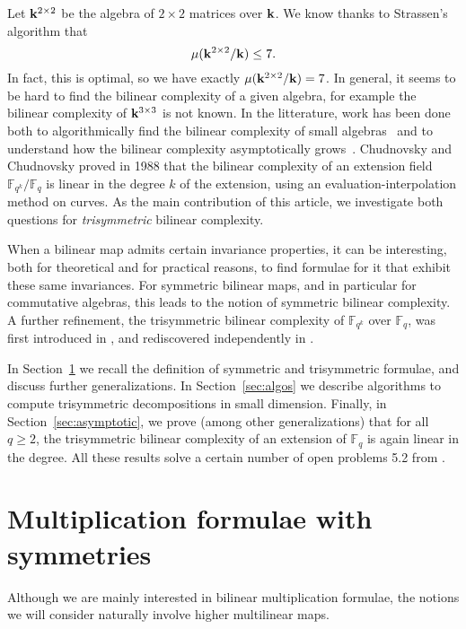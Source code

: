 \documentclass[11pt]{article}
\begin{document}
Let $\mathbf{k}^{2\times2}$ be the algebra
of $2\times2$ matrices over $\mathbf{k}$. We know thanks to Strassen's algorithm that 
\[
  \mu(\mathbf{k}^{2\times 2}/\mathbf{k}) \leq 7.
\]
In fact, this is optimal, so we have exactly $\mu(\mathbf{k}^{2\times2}/\mathbf{k})=7$. In
general, it seems to be hard to find the bilinear complexity of a given algebra,
for example the bilinear complexity of $\mathbf{k}^{3\times3}$ is not known.
In the litterature, work has been done both to algorithmically find the bilinear complexity of
small algebras~\cite{BDEZ12, Covanov19} and to understand how the bilinear
complexity asymptotically grows~\cite{CC88, BCPRRR19}. Chudnovsky and Chudnovsky
proved in 1988 that the bilinear complexity of an extension field
$\mathbb{F}_{q^k}/\mathbb{F}_{q}$ is linear in the degree $k$ of the
extension, using an evaluation-interpolation method on curves.
As the main contribution of this article, we
investigate both questions for \emph{trisymmetric} bilinear complexity.

When a bilinear map admits certain invariance properties, it can be interesting,
both for theoretical and for practical reasons,
to find formulae for it that exhibit these same invariances.
For symmetric bilinear maps, and in particular for commutative algebras, this leads to the notion of symmetric bilinear complexity.
A further refinement, the trisymmetric bilinear complexity of $\mathbb{F}_{q^k}$ over $\mathbb{F}_{q}$, was first introduced in \cite{SL84}, and rediscovered independently in \cite[App.~A]{Randriam15}.

In Section~\ref{sec:symtrisym} we recall the definition of symmetric and trisymmetric formulae, and discuss further generalizations. In Section~\ref{sec:algos} we
describe algorithms to compute trisymmetric decompositions in small dimension.
Finally, in
Section~\ref{sec:asymptotic}, we prove (among other generalizations) that for all $q\geq2$, the trisymmetric bilinear
complexity of an extension of $\mathbb{F}_q$ is again linear in the degree.
All these results solve a certain number of open problems 5.2 from \cite{BCPRRR19}.

\section{Multiplication formulae with symmetries}
\label{sec:symtrisym}

Although we are mainly interested in bilinear multiplication formulae,
the notions we will consider naturally involve higher multilinear maps.
\end{document}
